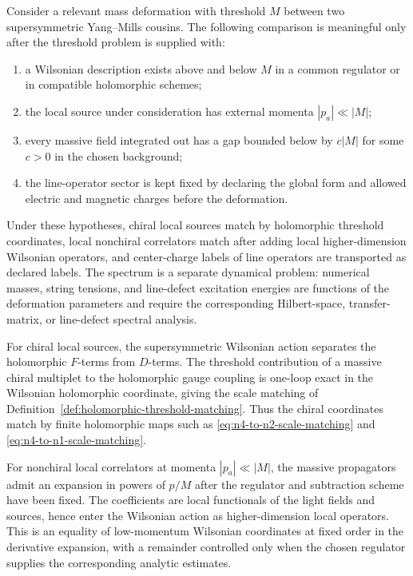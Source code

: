\begin{controlledapproximation}
\label{ca:observable-type-threshold-comparison}
Consider a relevant mass deformation with threshold \(M\) between two
supersymmetric Yang--Mills cousins.  The following comparison is meaningful
only after the threshold problem is supplied with:
\begin{enumerate}[label=(\roman*)]
\item a Wilsonian description exists above and below \(M\) in a common
  regulator or in compatible holomorphic schemes;
\item the local source under consideration has external momenta
  \(|p_a|\ll |M|\);
\item every massive field integrated out has a gap bounded below by
  \(c|M|\) for some \(c>0\) in the chosen background;
\item the line-operator sector is kept fixed by declaring the global form and
  allowed electric and magnetic charges before the deformation.
\end{enumerate}
Under these hypotheses, chiral local sources match by holomorphic threshold
coordinates, local nonchiral correlators match after adding local
higher-dimension Wilsonian operators, and center-charge labels of line
operators are transported as declared labels.  The spectrum is a separate
dynamical problem: numerical masses, string tensions, and line-defect
excitation energies are functions of the deformation parameters and require
the corresponding Hilbert-space, transfer-matrix, or line-defect spectral
analysis.

For chiral local sources, the supersymmetric Wilsonian action separates the
holomorphic \(F\)-terms from \(D\)-terms.  The threshold contribution of a
massive chiral multiplet to the holomorphic gauge coupling is one-loop exact
in the Wilsonian holomorphic coordinate, giving the scale matching of
Definition~\ref{def:holomorphic-threshold-matching}.  Thus the chiral
coordinates match by finite holomorphic maps such as
\eqref{eq:n4-to-n2-scale-matching} and \eqref{eq:n4-to-n1-scale-matching}.

For nonchiral local correlators at momenta \(|p_a|\ll |M|\), the massive
propagators admit an expansion in powers of \(p/M\) after the regulator and
subtraction scheme have been fixed.  The coefficients are local functionals
of the light fields and sources, hence enter the Wilsonian action as
higher-dimension local operators.  This is an equality of low-momentum
Wilsonian coordinates at fixed order in the derivative expansion, with a
remainder controlled only when the chosen regulator supplies the corresponding
analytic estimates.


\end{controlledapproximation}
